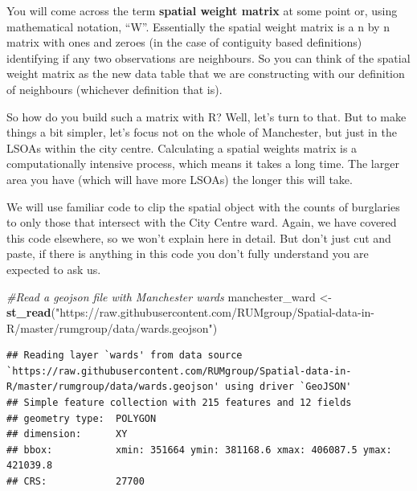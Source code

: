 \documentclass[]{book}
\newenvironment{Shaded}{\begin{snugshade}}{\end{snugshade}}
\newcommand{\CommentTok}[1]{\textcolor[rgb]{0.56,0.35,0.01}{\textit{#1}}}
\newcommand{\DecValTok}[1]{\textcolor[rgb]{0.00,0.00,0.81}{#1}}
\newcommand{\KeywordTok}[1]{\textcolor[rgb]{0.13,0.29,0.53}{\textbf{#1}}}
\newcommand{\NormalTok}[1]{#1}
\newcommand{\OperatorTok}[1]{\textcolor[rgb]{0.81,0.36,0.00}{\textbf{#1}}}
\newcommand{\StringTok}[1]{\textcolor[rgb]{0.31,0.60,0.02}{#1}}
\begin{document}
You will come across the term \textbf{spatial weight matrix} at some point or, using mathematical notation, ``W''. Essentially the spatial weight matrix is a n by n matrix with ones and zeroes (in the case of contiguity based definitions) identifying if any two observations are neighbours. So you can think of the spatial weight matrix as the new data table that we are constructing with our definition of neighbours (whichever definition that is).

So how do you build such a matrix with R? Well, let's turn to that. But to make things a bit simpler, let's focus not on the whole of Manchester, but just in the LSOAs within the city centre. Calculating a spatial weights matrix is a computationally intensive process, which means it takes a long time. The larger area you have (which will have more LSOAs) the longer this will take.

We will use familiar code to clip the spatial object with the counts of burglaries to only those that intersect with the City Centre ward. Again, we have covered this code elsewhere, so we won't explain here in detail. But don't just cut and paste, if there is anything in this code you don't fully understand you are expected to ask us.

\begin{Shaded}
\begin{Highlighting}[]
\CommentTok{#Read a geojson file with Manchester wards}
\NormalTok{manchester_ward <-}\StringTok{ }\KeywordTok{st_read}\NormalTok{(}\StringTok{"https://raw.githubusercontent.com/RUMgroup/Spatial-data-in-R/master/rumgroup/data/wards.geojson"}\NormalTok{)}
\end{Highlighting}
\end{Shaded}

\begin{verbatim}
## Reading layer `wards' from data source `https://raw.githubusercontent.com/RUMgroup/Spatial-data-in-R/master/rumgroup/data/wards.geojson' using driver `GeoJSON'
## Simple feature collection with 215 features and 12 fields
## geometry type:  POLYGON
## dimension:      XY
## bbox:           xmin: 351664 ymin: 381168.6 xmax: 406087.5 ymax: 421039.8
## CRS:            27700
\end{verbatim}

\begin{Shaded}
\end{Shaded}
\end{document}
